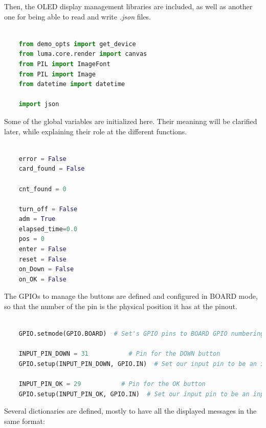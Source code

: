 \documentclass[12pt,a4paper,oneside]{article} %
\begin{document}
Then, the OLED display management libraries are included, as well as another one for being able to read and write \emph{.json} files.

\begin{lstlisting}[language=python]

	from demo_opts import get_device
	from luma.core.render import canvas
	from PIL import ImageFont
	from PIL import Image
	from datetime import datetime

	import json

\end{lstlisting}

Some of the global variables are initialized here. Their meaninng will be clarified later, while explaining their role at the different functions.

\begin{lstlisting}[language=python]

	error = False
	card_found = False

	cnt_found = 0

	turn_off = False
	adm = True
	elapsed_time=0.0
	pos = 0
	enter = False
	reset = False
	on_Down = False
	on_OK = False

\end{lstlisting}

The GPIOs to manage the buttons are defined and configured in BOARD mode, so that the number of the pin is the physical position it has at the pinout.

\begin{lstlisting}[language=python]

	GPIO.setmode(GPIO.BOARD)  # Set's GPIO pins to BOARD GPIO numbering
	
	INPUT_PIN_DOWN = 31           # Pin for the DOWN button
	GPIO.setup(INPUT_PIN_DOWN, GPIO.IN)  # Set our input pin to be an input
	
	INPUT_PIN_OK = 29           # Pin for the OK button
	GPIO.setup(INPUT_PIN_OK, GPIO.IN)  # Set our input pin to be an input

\end{lstlisting}

Several dictionaries are defined, mostly to have all the displayed messages in the same format:
\end{document}
